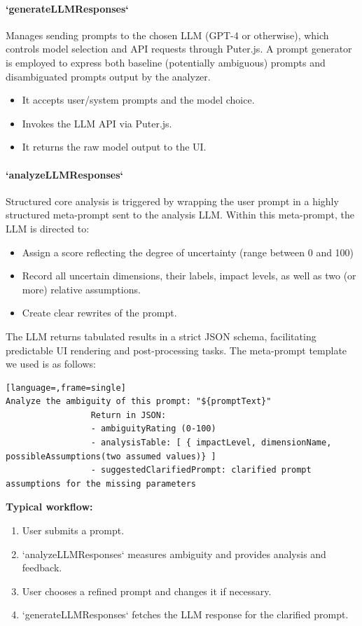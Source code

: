 \documentclass[11pt,a4paper]{article}
\begin{document}
\paragraph{`generateLLMResponses`}
Manages sending prompts to the chosen LLM (GPT-4 or otherwise), which controls model selection and API requests through Puter.js. A prompt generator is employed to express both baseline (potentially ambiguous) prompts and disambiguated prompts output by the analyzer.
\begin{itemize}
    \item It accepts user/system prompts and the model choice.
    \item Invokes the LLM API via Puter.js.
    \item It returns the raw model output to the UI.
\end{itemize}

\paragraph{`analyzeLLMResponses`}
Structured core analysis is triggered by wrapping the user prompt in a highly structured meta-prompt sent to the analysis LLM.
Within this meta-prompt, the LLM is directed to:
\begin{itemize}
    \item Assign a score reflecting the degree of uncertainty (range between 0 and 100)
    \item Record all uncertain dimensions, their labels, impact levels, as well as two (or more) relative assumptions.
    \item Create clear rewrites of the prompt.
\end{itemize}
The LLM returns tabulated results in a strict JSON schema, facilitating predictable UI rendering and post-processing tasks. The meta-prompt template we used is as follows:

\begin{lstlisting}[language=,frame=single]
Analyze the ambiguity of this prompt: "${promptText}"
                 Return in JSON:
                 - ambiguityRating (0-100)
                 - analysisTable: [ { impactLevel, dimensionName, possibleAssumptions(two assumed values)} ]
                 - suggestedClarifiedPrompt: clarified prompt assumptions for the missing parameters
\end{lstlisting}

\textbf{Typical workflow:}
\begin{enumerate}
    \item User submits a prompt.
    \item `analyzeLLMResponses` measures ambiguity and provides analysis and feedback.
    \item User chooses a refined prompt and changes it if necessary.
    \item `generateLLMResponses` fetches the LLM response for the clarified prompt.
\end{enumerate}
\end{document}
